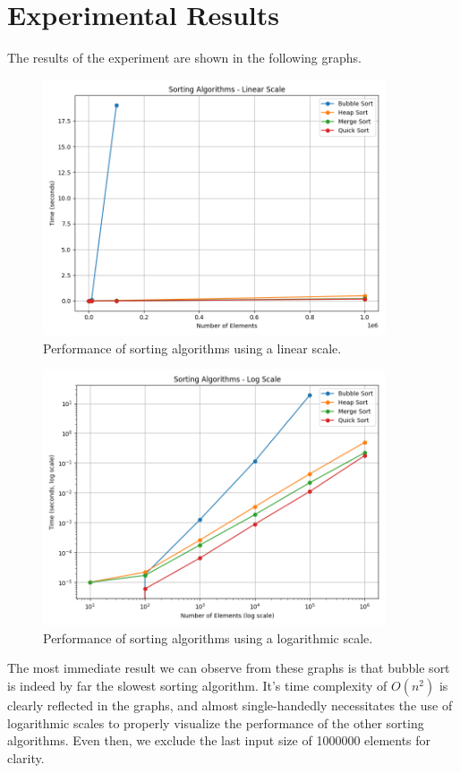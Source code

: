 \documentclass{article}
\begin{document}
\section{Experimental Results}
The results of the experiment are shown in the following graphs.

\begin{figure}[H]
    \centering
    \includegraphics[width=0.9\textwidth]{../plotting/linear.png}
    \caption{Performance of sorting algorithms using a linear scale.}
\end{figure}

\begin{figure}[H]
    \centering
    \includegraphics[width=0.9\textwidth]{../plotting/log.png}
    \caption{Performance of sorting algorithms using a logarithmic scale.}
\end{figure}

The most immediate result we can observe from these graphs is that bubble sort is indeed by far the slowest sorting algorithm.
It's time complexity of $O(n^2)$ is clearly reflected in the graphs, and almost single-handedly necessitates the use of logarithmic scales to properly visualize the performance of the other sorting algorithms.
Even then, we exclude the last input size of 1000000 elements for clarity.
\end{document}
